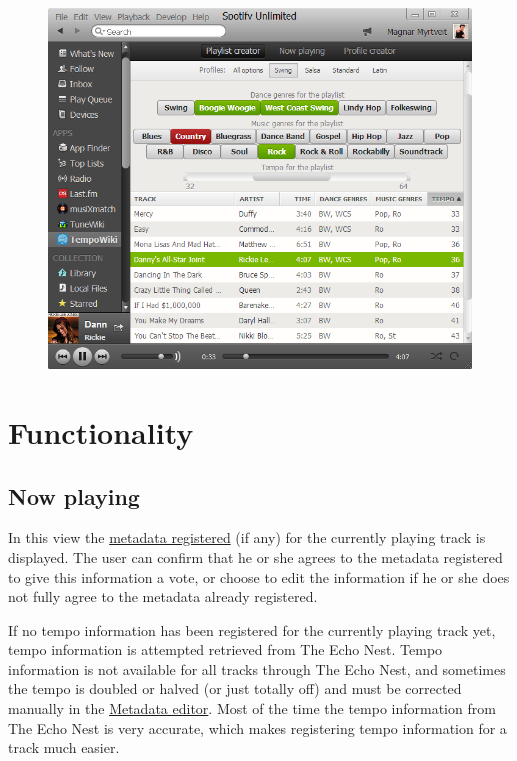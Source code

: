 \documentclass[a4paper, 12pt]{article}
\begin{document}
\begin{figure}[placement h]
\includegraphics{img/user-interface.png}
\end{figure}

\section{Functionality}
\subsection{Now playing}
\label{sec:player}
In this view the \hyperref[sec:fetching]{metadata registered} (if any) for the currently playing track is displayed. The user can confirm that he or she agrees to the metadata registered to give this information a vote, or choose to edit the information if he or she does not fully agree to the metadata already registered.

If no tempo information has been registered for the currently playing track yet, tempo information is attempted retrieved from The Echo Nest. Tempo information is not available for all tracks through The Echo Nest, and sometimes the tempo is doubled or halved (or just totally off) and must be corrected manually in the \hyperref[sec:editor]{Metadata editor}. Most of the time the tempo information from The Echo Nest is very accurate, which makes registering tempo information for a track much easier.
\end{document}
